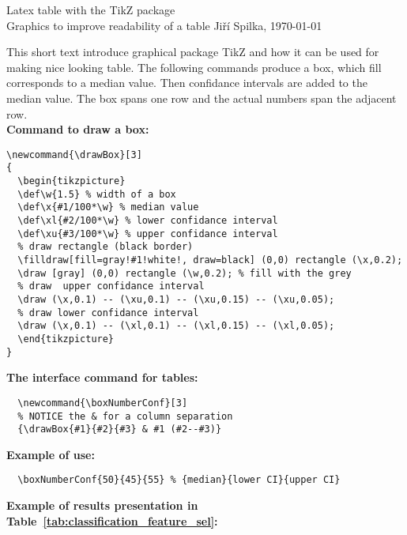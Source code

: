 \documentclass[a4paper,11pt,oneside]{report}
\newcommand{\drawBox}[3]
{
\begin{tikzpicture}
\def\w{1.5} %
\def\x{#1/100*\w} %
\def\xl{#2/100*\w} %
\def\xu{#3/100*\w} %
\filldraw[fill=gray!#1!white!, draw=black] (0,0) rectangle (\x,0.2); %
\draw [gray] (0,0) rectangle (\w,0.2); %
\draw (\x,0.1) -- (\xu,0.1) -- (\xu,0.15) -- (\xu,0.05); %
\draw (\x,0.1) -- (\xl,0.1) -- (\xl,0.15) -- (\xl,0.05); %
\end{tikzpicture} 
}
\newcommand{\boxNumberConf}[3]
{\drawBox{#1}{#2}{#3} & #1 (#2--#3)} %
\begin{document}
\begin{center}
 {\Large Latex table with the TikZ package}\\
 {Graphics to improve readability of a table}
 \vglue 0.5cm
 Ji\v{r}\'{i} Spilka, \today
 \vglue 0.5cm
\end{center}

This short text introduce graphical package TikZ and how it can be used for making nice looking table. The following commands produce a box, which fill 
corresponds to a median value. Then confidance intervals are added to the median value. The box spans one row and the actual numbers span the adjacent row. \\

\noindent \textbf{Command to draw a box:}

{\small
\begin{verbatim} 
\newcommand{\drawBox}[3]
{
  \begin{tikzpicture}
  \def\w{1.5} % width of a box
  \def\x{#1/100*\w} % median value
  \def\xl{#2/100*\w} % lower confidance interval
  \def\xu{#3/100*\w} % upper confidance interval
  % draw rectangle (black border)
  \filldraw[fill=gray!#1!white!, draw=black] (0,0) rectangle (\x,0.2); 
  \draw [gray] (0,0) rectangle (\w,0.2); % fill with the grey
  % draw  upper confidance interval
  \draw (\x,0.1) -- (\xu,0.1) -- (\xu,0.15) -- (\xu,0.05);
  % draw lower confidance interval
  \draw (\x,0.1) -- (\xl,0.1) -- (\xl,0.15) -- (\xl,0.05); 
  \end{tikzpicture} 
}
\end{verbatim}
}

\noindent \textbf{The interface command for tables:}
{\small
\begin{verbatim}
  \newcommand{\boxNumberConf}[3]
  % NOTICE the & for a column separation
  {\drawBox{#1}{#2}{#3} & #1 (#2--#3)} 
\end{verbatim}
}

\noindent \textbf{Example of use:}
{\small
\begin{verbatim} 
  \boxNumberConf{50}{45}{55} % {median}{lower CI}{upper CI}
\end{verbatim}
}

\noindent \textbf{Example of results presentation in Table~\ref{tab:classification_feature_sel}:}
\end{document}
